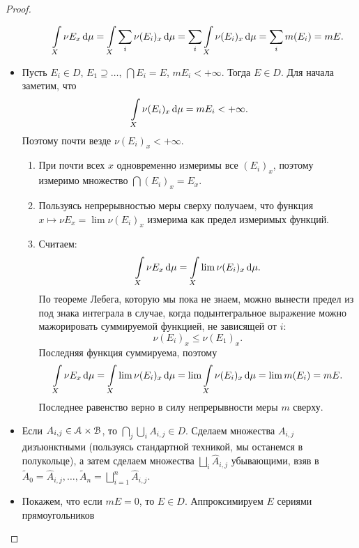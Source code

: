 \begin{proof}
\begin{itemize}
\begin{enumerate}
                    \[
                        \int\limits_X{\nu{E_x} \,\mathrm{d}\mu} = \int\limits_X{\sum_i{\nu{(E_i)_x}} \,\mathrm{d}\mu} =
                        \sum_i{\int\limits_X{\nu{(E_i)_x} \,\mathrm{d}\mu}} = \sum_i{m(E_i)} = m{E}
                    .\]
            \end{enumerate}
        \item Пусть $E_i \in D$, $E_1 \supseteq \ldots $, $\bigcap{E_i} = E$, $m{E_i} < +\infty$.
            Тогда $E \in D$. Для начала заметим, что
            \[
                \int\limits_X{\nu{(E_i)_x} \,\mathrm{d}\mu} = m{E_i} < +\infty
            .\]
            Поэтому почти везде $\nu{(E_i)_x} < +\infty$.
            \begin{enumerate}
                \item При почти всех $x$ одновременно измеримы все $(E_i)_x$, поэтому измеримо
                    множество $\bigcap{(E_i)_x} = E_x$.
                \item Пользуясь непрерывностью меры сверху получаем, что функция
                    $x \mapsto \nu{E_x} = \lim{\nu{(E_i)_x}}$ измерима как предел измеримых функций.
                \item Считаем:
                    \[
                        \int\limits_X{\nu{E_x} \,\mathrm{d}\mu} = \int\limits_X{\lim{\nu{(E_i)_x}} \,\mathrm{d}\mu}
                    .\]
                    По теореме Лебега, которую мы пока не знаем, можно вынести предел из под знака интеграла
                    в случае, когда подынтегральное выражение можно мажорировать суммируемой функцией, 
                    не зависящей от $i$:
                    \[
                        \nu{(E_i)_x} \leqslant \nu{(E_1)_x}
                    .\]
                    Последняя функция суммируема, поэтому
                    \[
                        \int\limits_X{\nu{E_x} \,\mathrm{d}\mu} = \int\limits_X{\lim{\nu{(E_i)_x}} \,\mathrm{d}\mu} = \lim{\int\limits_X{\nu{(E_i)_x} \,\mathrm{d}\mu}} =
                        \lim{m(E_i)} = m{E}
                    .\]
                    Последнее равенство верно в силу непрерывности меры $m$ сверху.
            \end{enumerate}
        \item Если $A_{i,j} \in \mathcal{A} \times \mathcal{B}$, то $\bigcap_j{\bigcup_i{A_{i,j}}} \in D$.
            Сделаем множества $A_{i, j}$ дизъюнктными (пользуясь стандартной техникой, мы останемся в полукольце),
            а затем сделаем множества $\bigsqcup_i{\hat{A}_{i, j}}$ убывающими, взяв
            в $\widetilde{A}_0 = \hat{A}_{i, j}, \ldots, \widetilde{A}_n = \bigsqcup_{i = 1}^n{\hat{A}_{i, j}}$.
        \item Покажем, что если $m{E} = 0$, то $E \in D$. Аппроксимируем $E$ сериями прямоугольников

\end{itemize}
\end{proof}
